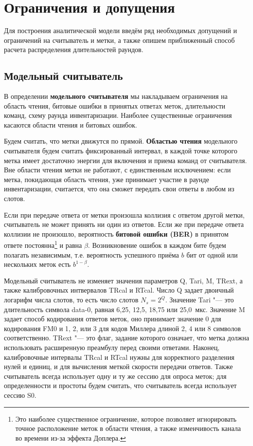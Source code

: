 \section{Ограничения и допущения}\label{sec:ch3_assumptions}
Для построения аналитической модели введём ряд необходимых допущений и ограничений на считыватель и метки, а также опишем приближенный способ расчета распределения длительностей раундов.


\subsection{Модельный считыватель}
В определении \textbf{модельного считывателя} мы накладываем ограничения на область чтения, битовые ошибки в принятых ответах меток, длительности команд, схему раунда инвентаризации. Наиболее существенные ограничения касаются области чтения и битовых ошибок.

Будем считать, что метки движутся по прямой. \textbf{Областью чтения} модельного считывателя будем считать фиксированный интервал, в каждой точке которого метка имеет достаточно энергии для включения и приема команд от считывателя. Вне области чтения метки не работают, с единственным исключением: если метка, покидающая область чтения, уже принимает участие в раунде инвентаризации, считается, что она сможет передать свои ответы в любом из слотов.

Если при передаче ответа от метки произошла коллизия с ответом другой метки, считыватель не может принять ни один из ответов. Если же при передаче ответа коллизии не произошло, вероятность \textbf{битовой ошибки (BER)} в принятом ответе постоянна\footnote{Это наиболее существенное ограничение, которое позволяет игнорировать точное расположение меток в области чтения, а также изменчивость канала во времени из-за эффекта Доплера.} и равна $\beta$. Возникновение ошибок в каждом бите будем полагать независимым, т.е. вероятность успешного приёма $b$ бит от одной или нескольких меток есть $b^{1 - \beta}$.

Модельный считыватель не изменяет значения параметров Q, Tari, M, TRext, а также калибровочных интвервалов TRcal и RTcal. Число Q задает двоичный логарифм числа слотов, то есть число слотов $N_s = 2^Q$. Значение Tari "--- это длительность символа data-0, равная 6,25, 12,5, 18,75 или 25,0~мкс. Значение M задает способ кодирования ответов меток, оно принимает значение 0 для кодирования FM0 и 1, 2, или 3 для кодов Миллера длиной 2, 4 или 8 символов соответственно. TRext "--- это флаг, задание которого означает, что метка должна использовать расширенную преамбулу перед своими ответами. Наконец, калибровочные интервалы TRcal и RTcal нужны для корректного разделения нулей и единиц, и для вычисления меткой скорости передачи ответов. Также считыватель всегда использует одну и ту же сессию для опроса меток; для определенности и простоты будем считать, что считыватель всегда использует сессию S0.

